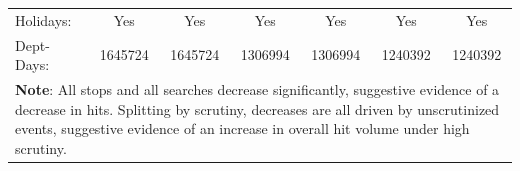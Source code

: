 \begin{tabular}{l*{6}{c}}
Holidays:   &         Yes         &         Yes         &         Yes         &         Yes         &         Yes         &         Yes         \\
Dept-Days:  &     1645724         &     1645724         &     1306994         &     1306994         &     1240392         &     1240392         \\
\hline \multicolumn{7}{p{\linewidth}}{\textbf{Note}: All stops and all searches decrease significantly, suggestive evidence of a decrease in hits. Splitting by scrutiny, decreases are all driven by unscrutinized events, suggestive evidence of an increase in overall hit volume under high scrutiny.} \\ \hline \end{tabular}

